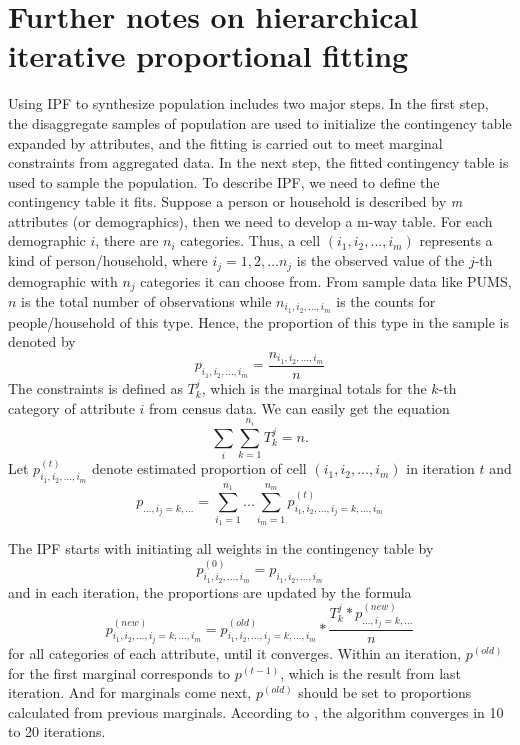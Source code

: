\documentclass[11pt,twoside]{article}
\numberwithin{equation}{section}
\newcommand{\?}{\stackrel{?}{=}}
\begin{document}
\section{Further notes on hierarchical iterative proportional fitting}
Using IPF to synthesize population includes two major steps.
In the first step, the disaggregate samples of population are used to initialize the contingency table expanded by attributes, and the fitting is carried out to meet marginal constraints from aggregated data.
In the next step, the fitted contingency table is used to sample the population.
To describe IPF, we need to define the contingency table it fits.
Suppose a person or household is described by \textit{m} attributes (or demographics), then we need to develop a m-way table.
For each demographic $i$, there are $n_i$ categories.
Thus, a cell $(i_1, i_2,..., i_m)$ represents a kind of person/household, where $i_j = 1,2,...n_j$ is the observed value of the $j$-th demographic with $n_j$ categories it can choose from.
From sample data like PUMS, $n$ is the total number of observations while $n_{i_1, i_2,...,i_m}$ is the counts for people/household of this type.
Hence, the proportion of this type in the sample is denoted by
\begin{equation}
  \label{eqn:prop}
   p_{i_1,i_2,...,i_m} = \frac{n_{i_1, i_2,...,i_m}}{n}
\end{equation}
The constraints is defined as $T_k^j$, which is the marginal totals for the $k$-th category of attribute $i$ from census data.
We can easily get the equation
\begin{equation}
  \label{eq:2}
\sum_i\sum_{k=1}^{n_i}T_k^j=n.  
\end{equation}
Let $p_{i_1,i_2,...,i_m}^{(t)}$ denote estimated proportion of cell $(i_1, i_2,..., i_m)$ in iteration $t$ and
\begin{equation}
  \label{eq:3}
  p_{...,i_j=k,...} = \sum_{i_1=1}^{n_1}...\sum_{i_m=1}^{n_m}p_{i_1,i_2,...,i_j=k,...,i_m}^{(t)}  
\end{equation}

The IPF starts with initiating all weights in the contingency table by  
\begin{equation}
	p_{i_1,i_2,...,i_m}^{(0)} = p_{i_1,i_2,...,i_m}
\end{equation}
and in each iteration, the proportions are updated by the formula
\begin{equation}
  p_{i_1,i_2,...,i_j=k,...,i_m}^{(new)} = p_{i_1,i_2,...,i_j=k,...,i_m}^{(old)} * \frac{T_k^j * p_{...,i_j=k,...}^{(new)}}{n} 
\end{equation} for all categories of each attribute, until it converges.
Within an iteration, $p^{(old)}$ for the first marginal corresponds to $p^{(t-1)}$, which is the result from last iteration.
And for marginals come next, $p^{(old)}$ should be set to proportions calculated from previous marginals.
According to \cite{beckman1996creating}, the algorithm converges in 10 to 20 iterations.
\end{document}
